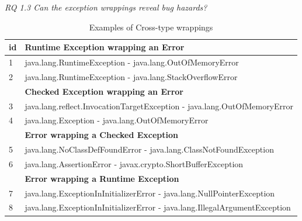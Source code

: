 \bigskip


\bigskip

\noindent\emph{RQ 1.3 Can the exception wrappings reveal bug hazards?}

\bigskip

\begin{table}
\scriptsize
\centering

\begin{tabular}{ll}
    \hline
 id & \bfseries{Runtime Exception wrapping an Error}    \\  %
    \hline
1 & java.lang.RuntimeException - java.lang.OutOfMemoryError  \\ %
2& java.lang.RuntimeException -  java.lang.StackOverflowError   \\ %
\hline
& \bfseries{Checked Exception wrapping an Error}  \\
 \hline
3&java.lang.reflect.InvocationTargetException - java.lang.OutOfMemoryError  \\ %
4&java.lang.Exception - java.lang.OutOfMemoryError   \\ %
\hline
& \bfseries{Error wrapping a Checked Exception}  \\
 \hline
5&java.lang.NoClassDefFoundError - java.lang.ClassNotFoundException   \\ %
6&java.lang.AssertionError - javax.crypto.ShortBufferException   \\ %
\hline
& \bfseries{Error wrapping a Runtime Exception}    \\
 \hline
7&java.lang.ExceptionInInitializerError - java.lang.NullPointerException   \\ %
8&java.lang.ExceptionInInitializerError - java.lang.IllegalArgumentException 	 \\ %
 \hline
  \end{tabular}
\caption{Examples of Cross-type wrappings}
\label{tab:exampeswrap}
\end{table}

